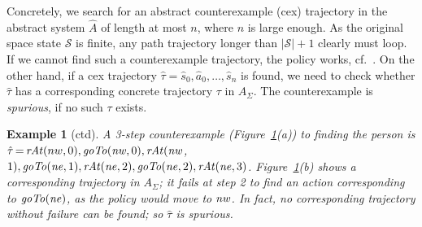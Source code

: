\documentclass{new_tlp}
\newcommand{\comment}[1]{{\bf\color{blue}{*** #1 ***}}}
\newcommand{\comment}[1]{}
\newcommand{\sys}{\ensuremath{A}}
\newcommand{\absys}{\ensuremath{\widehat{A}}}
\def\mi#1{\mathit{#1\/}}
\newtheorem{exmp}{Example}
\begin{document}
Concretely, we search for an abstract counterexample (cex)
trajectory in the abstract system $\absys$
of length at most $n$, where
$n$ is large enough. As the original space state $\mathcal{S}$ is
finite, any path trajectory longer than $|\mathcal{S}|+1$
clearly must loop. If we cannot find such a counterexample trajectory, the policy works, cf.\ \cite{ClarkeKOS04}. 
%
On the other hand,  if  a cex trajectory
$\hat{\tau}=\hat{s}_0,\hat{a}_0,\dots,\hat{s}_n$ is found, we need to
check whether $\hat{\tau}$ has a corresponding concrete trajectory $\tau$ in $\sys_\Sigma$. 
The counterexample is \emph{spurious}, if no such 
$\tau$ exists.

\begin{figure}[t]
\caption{}
\centering
{}
\label{fig:failure}

\vspace*{-1.5\baselineskip}

\end{figure}


\begin{exmp}[ctd]\label{ex:spur}
A 3-step counterexample (Figure~\ref{fig:failure}(a)) to
finding the person %
is 
$\hat{\tau}\,{=}\,\mi{rAt}(nw,0),\mi{goTo}(\mi{nw},0),\mi{rAt}(\mi{nw}$, $1),\mi{goTo}(\mi{ne},1),\mi{rAt(ne},2),\mi{goTo}(\mi{ne},2),\mi{rAt(ne},3)$.
Figure~\ref{fig:failure}(b) shows a corresponding trajectory %
in 
$\sys_\Sigma$;
it fails at step 2 to find an
action corresponding to
$\mi{goTo}(\mi{ne})$, 
as the %
policy 
would move to $\mi{nw}$. In fact, no corresponding trajectory 
without
failure can be found; so $\hat{\tau}$ is spurious.
\end{exmp}
 
\end{document}
